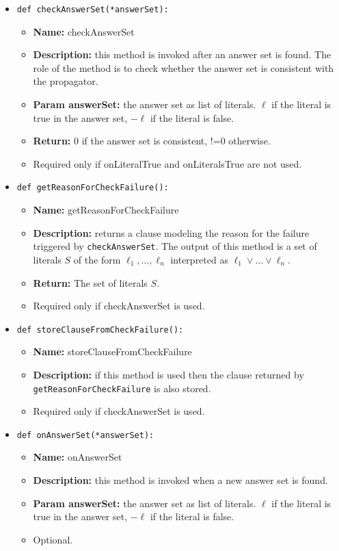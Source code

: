 \documentclass[a4paper,12pt]{article}
\begin{document}
\begin{itemize}
		\item \texttt{def checkAnswerSet(*answerSet):}
		\begin{itemize}
			\item \textbf{Name:} checkAnswerSet
			\item \textbf{Description:} this method is invoked after an answer set is found. The role of the method is to check whether the answer set is consistent with the propagator.
			\item \textbf{Param answerSet:} the answer set as list of literals. $\ell$ if the literal is true in the answer set, $-\ell$ if the literal is false.						
			\item \textbf{Return:} 0 if the answer set is consistent, !=0 otherwise.
			\item Required only if onLiteralTrue and onLiteralsTrue are not used.
		\end{itemize}
		
		\item \texttt{def getReasonForCheckFailure():}
		\begin{itemize}
			\item \textbf{Name:} getReasonForCheckFailure
			\item \textbf{Description:} returns a clause modeling the reason for the failure triggered by \texttt{checkAnswerSet}. The output of this method is a set of literals $S$ of the form $\ell_1, \ldots, \ell_n$ interpreted as $\ell_1 \vee \ldots \vee \ell_n$.
			\item \textbf{Return:} The set of literals $S$.					
			\item Required only if checkAnswerSet is used.
		\end{itemize}
		
		\item \texttt{def storeClauseFromCheckFailure():}
		\begin{itemize}
			\item \textbf{Name:} storeClauseFromCheckFailure
			\item \textbf{Description:} if this method is used then the clause returned by \texttt{getReasonForCheckFailure} is also stored.
			\item Required only if checkAnswerSet is used.
		\end{itemize}
		
		\item \texttt{def onAnswerSet(*answerSet):}
		\begin{itemize}
			\item \textbf{Name:} onAnswerSet
			\item \textbf{Description:} this method is invoked when a new answer set is found.
			\item \textbf{Param answerSet:} the answer set as list of literals. $\ell$ if the literal is true in the answer set, $-\ell$ if the literal is false.
			\item Optional.
		\end{itemize}
		

\end{itemize}
\end{document}
